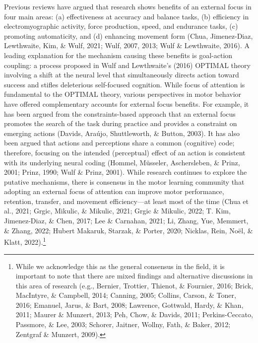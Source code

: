 \documentclass[
  man, donotrepeattitle,floatsintext]{apa7}
\begin{document}
Previous reviews have argued that research shows benefits of an external focus in four main areas: (a) effectiveness at accuracy and balance tasks, (b) efficiency in electromyographic activity, force production, speed, and endurance tasks, (c) promoting automaticity, and (d) enhancing movement form (Chua, Jimenez-Diaz, Lewthwaite, Kim, \& Wulf, 2021; Wulf, 2007, 2013; Wulf \& Lewthwaite, 2016). A leading explanation for the mechanism causing these benefits is goal-action coupling: a process proposed in Wulf and Lewthwaite's (2016) OPTIMAL theory involving a shift at the neural level that simultaneously directs action toward success and stifles deleterious self-focused cognition. While focus of attention is fundamental to the OPTIMAL theory, various perspectives in motor behavior have offered complementary accounts for external focus benefits. For example, it has been argued from the constraints-based approach that an external focus promotes the search of the task during practice and provides a constraint on emerging actions (Davids, Araújo, Shuttleworth, \& Button, 2003). It has also been argued that actions and perceptions share a common (cognitive) code; therefore, focusing on the intended (perceptual) effect of an action is consistent with its underlying neural coding (Hommel, Müsseler, Aschersleben, \& Prinz, 2001; Prinz, 1990; Wulf \& Prinz, 2001). While research continues to explore the putative mechanisms, there is consensus in the motor learning community that adopting an external focus of attention can improve motor performance, retention, transfer, and movement efficiency---at least most of the time (Chua et al., 2021; Grgic, Mikulic, \& Mikulic, 2021; Grgic \& Mikulic, 2022; T. Kim, Jimenez-Diaz, \& Chen, 2017; Lee \& Carnahan, 2021; Li, Zhang, Yue, Memmert, \& Zhang, 2022; Hubert Makaruk, Starzak, \& Porter, 2020; Nicklas, Rein, Noël, \& Klatt, 2022).\footnote{While we acknowledge this as the general consensus in the field, it is important to note that there are mixed findings and alternative discussions in this area of research (e.g., Bernier, Trottier, Thienot, \& Fournier, 2016; Brick, MacIntyre, \& Campbell, 2014; Canning, 2005; Collins, Carson, \& Toner, 2016; Emanuel, Jarus, \& Bart, 2008; Lawrence, Gottwald, Hardy, \& Khan, 2011; Maurer \& Munzert, 2013; Peh, Chow, \& Davids, 2011; Perkins-Ceccato, Passmore, \& Lee, 2003; Schorer, Jaitner, Wollny, Fath, \& Baker, 2012; Zentgraf \& Munzert, 2009).}
\end{document}
